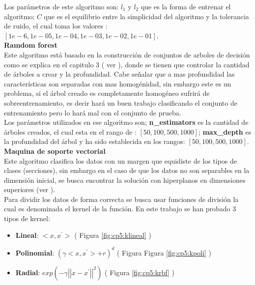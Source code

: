 Los parámetros de este algoritmo son: $l_1$ y $l_2$ que es la forma de entrenar el algoritmo; $C$ que es el equilibrio entre la simplicidad del algoritmo y la tolerancia de ruido, el cual toma los valores :$[1e-6, 1e-05, 1e-04, 1e-03, 1e-02, 1e-01]$.\\





\textbf{Ramdom forest}\\

Este algoritmo está basado en la construcción de conjuntos de arboles de decisión como se explica en el capitulo 3 ( ver  ), donde se tienen que controlar la cantidad de árboles a crear y la profundidad. Cabe señalar que a mas profundidad las características son separadas con mas homogénidad, sin embargo este es un problema, si el árbol creado es completamente homogéneo sufrirá de sobre\-entrenamiento, es decir hará un buen trabajo clasificando el conjunto de entrenamiento pero lo hará mal con el conjunto de prueba.\\

Los parámetros utilizados en ese algoritmo son; \textbf{n\_estimators} es la cantidad de árboles creados, el cual esta en el rango de : $[50, 100, 500, 1000]$; \textbf{max\_depth} es la profundidad del árbol y ha sido establecida en los rangos: $[50, 100, 500, 1000]$.\\

\textbf{Maquina de soporte vectorial}\\

Este algoritmo clasifica los datos con un margen que equidiste de los tipos de clases (secciones), sin embargo en el caso de que los datos no son separables en la dimensión inicial, se busca encontrar la solución con hiperplanos en dimensiones superiores (ver ).\\

Para dividir los datos de forma correcta se busca usar funciones de división la cual es denominada el kernel de la función. En este trabajo se han probado 3 tipos de kernel: 

\begin{itemize}

	\item \textbf{Lineal}: $<x,x^{'}>$ ( Figura \ref{fig:cp5:klineal} )

	\item \textbf{Polinomial}: $(\gamma <x,x^{'}>+r)^{d}$ ( Figura Figura \ref{fig:cp5:kpoli} )

	\item \textbf{Radial}: $exp(-\gamma {\left|\left| x-x^{'} \right|\right|}^2)$ ( Figura \ref{fig:cp5:krbf} )

\end{itemize}

